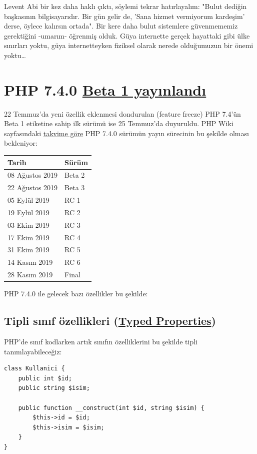 \documentclass[11pt]{article}
\begin{document}
Levent Abi bir kez daha haklı çıktı, söylemi tekrar hatırlayalım: "Bulut
dediğin başkasının bilgisayarıdır. Bir gün gelir de, 'Sana hizmet vermiyorum
kardeşim' derse, öylece kalırsın ortada". Bir kere daha bulut sistemlere
güvenmememiz gerektiğini -umarım- öğrenmiş olduk. Güya internette gerçek
hayattaki gibi ülke sınırları yoktu, güya internetteyken fiziksel olarak
nerede olduğumuzun bir önemi yoktu\ldots{}
\section{PHP 7.4.0 \href{https://www.php.net/archive/2019.php\#2019-07-25-1}{Beta 1 yayınlandı}}
\label{sec:org6d74481}
22 Temmuz'da yeni özellik eklenmesi dondurulan (feature freeze) PHP 7.4'ün Beta
1 etiketine sahip ilk sürümü ise 25 Temmuz'da duyuruldu. PHP Wiki sayfasındaki
\href{https://wiki.php.net/todo/php74}{takvime göre} PHP 7.4.0 sürümün yayın sürecinin bu şekilde olması bekleniyor:

\begin{center}
\begin{tabular}{ll}
Tarih & Sürüm\\
\hline
08 Ağustos 2019 & Beta 2\\
22 Ağustos 2019 & Beta 3\\
05 Eylül 2019 & RC 1\\
19 Eylül 2019 & RC 2\\
03 Ekim 2019 & RC 3\\
17 Ekim 2019 & RC 4\\
31 Ekim 2019 & RC 5\\
14 Kasım 2019 & RC 6\\
28 Kasım 2019 & Final\\
\end{tabular}
\end{center}

PHP 7.4.0 ile gelecek bazı özellikler bu şekilde:
\subsection{Tipli sınıf özellikleri (\href{https://wiki.php.net/rfc/typed\_properties\_v2}{Typed Properties})}
\label{sec:org4769101}
PHP'de sınıf kodlarken artık sınıfın özelliklerini bu şekilde tipli
tanımlayabileceğiz:

\begin{verbatim}
class Kullanici {
    public int $id;
    public string $isim;

    public function __construct(int $id, string $isim) {
        $this->id = $id;
        $this->isim = $isim;
    }
}
\end{verbatim}
\end{document}

